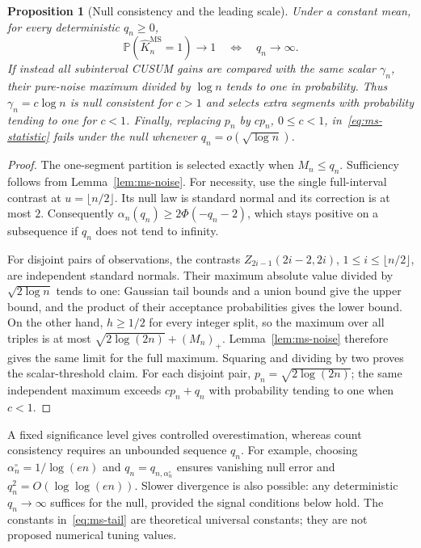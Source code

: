 \documentclass[pdflatex,sn-mathphys-num]{sn-jnl}
\newcommand{\Prob}{\mathbb P}
\theoremstyle{thmstyleone}
\newtheorem{proposition}[theorem]{Proposition}
\theoremstyle{thmstyletwo}
\begin{document}
\begin{proposition}[Null consistency and the leading scale]\label{prop:ms-null}
Under a constant mean, for every deterministic $q_n\ge0$,
\begin{equation}\label{eq:ms-null-iff}
\Prob(\widehat K_n^{\mathrm{MS}}=1)\to1
\quad\Longleftrightarrow\quad q_n\to\infty.
\end{equation}
If instead all subinterval CUSUM gains are compared with the same scalar
$\gamma_n$, their pure-noise maximum divided by $\log n$ tends to one in
probability. Thus $\gamma_n=c\log n$ is null consistent for $c>1$ and
selects extra segments with probability tending to one for $c<1$.
Finally, replacing $p_n$ by $c p_n$, $0\le c<1$, in~\eqref{eq:ms-statistic}
fails under the null whenever $q_n=o(\sqrt{\log n})$.
\end{proposition}
\begin{proof}
The one-segment partition is selected exactly when $M_n\le q_n$.
Sufficiency follows from Lemma~\ref{lem:ms-noise}. For necessity, use the
single full-interval contrast at $u=\lfloor n/2\rfloor$. Its null law is
standard normal and its correction is at most $2$. Consequently
$\alpha_n(q_n)\ge2\Phi(-q_n-2)$, which stays positive on a subsequence if
$q_n$ does not tend to infinity.

For disjoint pairs of observations, the contrasts
$Z_{2i-1}(2i-2,2i)$, $1\le i\le\lfloor n/2\rfloor$, are independent
standard normals. Their maximum absolute value divided by
$\sqrt{2\log n}$ tends to one: Gaussian tail bounds and a union bound give
the upper bound, and the product of their acceptance probabilities gives
the lower bound. On the other hand, $h\ge1/2$ for every integer split,
so the maximum over all triples is at most
$\sqrt{2\log(2n)}+(M_n)_+$.
Lemma~\ref{lem:ms-noise} therefore gives the same limit for the full maximum.
Squaring and dividing by two proves the scalar-threshold claim.
For each disjoint pair, $p_n=\sqrt{2\log(2n)}$; the same independent maximum
exceeds $c p_n+q_n$ with probability tending to one when $c<1$.
\end{proof}

A fixed significance level gives controlled overestimation, whereas count
consistency requires an unbounded sequence $q_n$. For example, choosing
$\alpha_n^\circ=1/\log(en)$ and $q_n=q_{n,\alpha_n^\circ}$ ensures vanishing
null error and $q_n^2=O(\log\log(en))$. Slower divergence is also possible:
any deterministic $q_n\to\infty$ suffices for the null, provided the signal
conditions below hold. The constants in~\eqref{eq:ms-tail} are theoretical
universal constants; they are not proposed numerical tuning values.
\end{document}
